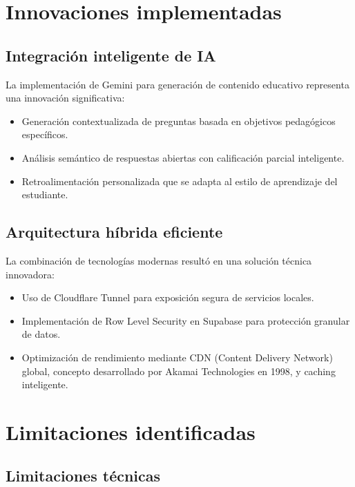 \documentclass[12pt,a4paper]{report}
\begin{document}
\section{Innovaciones implementadas}

\subsection{Integración inteligente de IA}

La implementación de Gemini para generación de contenido educativo representa una innovación significativa:

\begin{itemize}
\item Generación contextualizada de preguntas basada en objetivos pedagógicos específicos.
\item Análisis semántico de respuestas abiertas con calificación parcial inteligente.
\item Retroalimentación personalizada que se adapta al estilo de aprendizaje del estudiante.
\end{itemize}

\subsection{Arquitectura híbrida eficiente}

La combinación de tecnologías modernas resultó en una solución técnica innovadora:

\begin{itemize}
\item Uso de Cloudflare Tunnel para exposición segura de servicios locales.
\item Implementación de Row Level Security en Supabase para protección granular de datos.
\item Optimización de rendimiento mediante CDN (Content Delivery Network) global, concepto desarrollado por Akamai Technologies en 1998, y caching inteligente.
\end{itemize}

\section{Limitaciones identificadas}

\subsection{Limitaciones técnicas}
\end{document}
